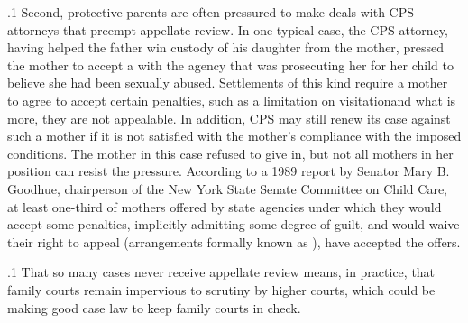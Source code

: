 \documentclass[11pt, twoside]{article}
\begin{document}
{\p.1{%
Second, protective parents are often pressured to make deals with CPS
attorneys that preempt appellate review. In one typical case, the CPS
attorney, having helped the father win custody of his daughter from
the mother, pressed the mother to accept a  with
the agency that was prosecuting her for  her child to
believe she had been sexually abused. Settlements of this kind require
a mother to agree to accept certain penalties, such as a limitation on
visitation\mdash{}and what is more, they are not appealable. In addition, CPS
may still renew its case against such a mother if it is not satisfied with
the mother’s compliance with the imposed conditions. The mother in
this case refused to give in, but not all mothers in her position can resist
the pressure. According to a 1989 report by Senator Mary B. Goodhue,
chairperson of the New York State Senate Committee on Child Care, at
least one-third of mothers offered  by state agencies under which
they would accept some penalties, implicitly admitting some degree of
guilt, and would waive their right to appeal (arrangements formally
known as ), have accepted
the offers.
}%

\p.1{%
That so many cases never receive appellate review means, in practice, that family courts remain impervious to scrutiny by higher courts,
which could be making good case law to keep family courts in check.
}%





}
\end{document}
